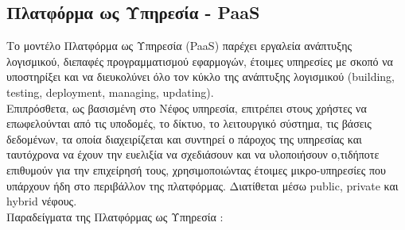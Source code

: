 \documentclass{article}
\begin{document}
\subsection{Πλατφόρμα ως Υπηρεσία - PaaS}
Το μοντέλο Πλατφόρμα ως Υπηρεσία (PaaS) παρέχει εργαλεία ανάπτυξης λογισμικού, διεπαφές προγραμματισμού εφαρμογών, έτοιμες υπηρεσίες με σκοπό να υποστηρίξει και να διευκολύνει όλο τον κύκλο της ανάπτυξης λογισμικού (building, testing, deployment, managing, updating). \\
Επιπρόσθετα, ως βασισμένη στο Νέφος υπηρεσία, επιτρέπει στους χρήστες να επωφελούνται από τις υποδομές, το δίκτυο, το λειτουργικό σύστημα, τις βάσεις δεδομένων, τα οποία διαχειρίζεται και συντηρεί ο πάροχος της υπηρεσίας και ταυτόχρονα να έχουν την ευελιξία να σχεδιάσουν και να υλοποιήσουν ο,τιδήποτε επιθυμούν για την επιχείρησή τους, χρησιμοποιώντας έτοιμες μικρο-υπηρεσίες που υπάρχουν ήδη στο περιβάλλον της πλατφόρμας. Διατίθεται μέσω  public, private και hybrid νέφους. \\
Παραδείγματα της Πλατφόρμας ως Υπηρεσία :
\end{document}
